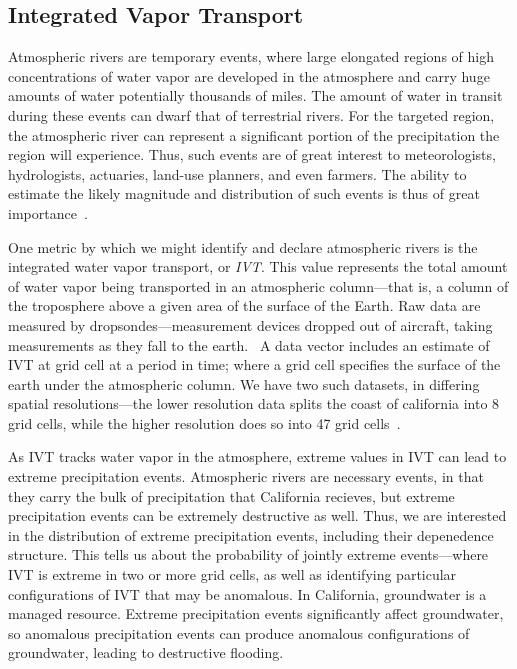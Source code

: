\subsection{Integrated Vapor Transport}
Atmospheric rivers are temporary events, where large elongated regions of high concentrations of
  water vapor are developed in the atmosphere and carry huge amounts of water potentially thousands
  of miles.  The amount of water in transit during these events can dwarf that of terrestrial rivers.
  For the targeted region, the atmospheric river can represent a significant portion of the
  precipitation the region will experience.  Thus, such events are of great interest to meteorologists,
  hydrologists, actuaries, land-use planners, and even farmers.  The ability to estimate the likely magnitude
  and distribution of such events is thus of great importance~\citep{ralph2013,ralph2018}.

One metric by which we might identify and declare atmospheric rivers is the integrated water vapor
  transport, or \emph{IVT}.  This value represents the total amount of water
  vapor being transported in an atmospheric column---that is, a column of the troposphere above a given
  area of the surface of the Earth. Raw data are measured by dropsondes---measurement devices dropped
  out of aircraft, taking measurements as they fall to the earth.~\citep{ralph2017}  A data vector
  includes an estimate of IVT at grid cell at a period in time; where a grid cell specifies the surface
  of the earth under the atmospheric column.  We have two such datasets, in differing spatial
  resolutions---the lower resolution data splits the coast of california into 8 grid cells, while the
  higher resolution does so into 47 grid cells~\citep{guan2015}.

As IVT tracks water vapor in the atmosphere, extreme values in IVT can lead to
  extreme precipitation events.  Atmospheric rivers are necessary events, in that they carry the
  bulk of precipitation that California recieves, but extreme precipitation events can be extremely
  destructive as well.  Thus, we are interested in the distribution of extreme precipitation events,
  including their depenedence structure.  This tells us about the probability of jointly extreme
  events---where IVT is extreme in two or more grid cells, as well as identifying particular
  configurations of IVT that may be anomalous.  In California, groundwater is a managed resource.
  Extreme precipitation events significantly affect groundwater, so anomalous precipitation events
  can produce anomalous configurations of groundwater, leading to destructive flooding.

